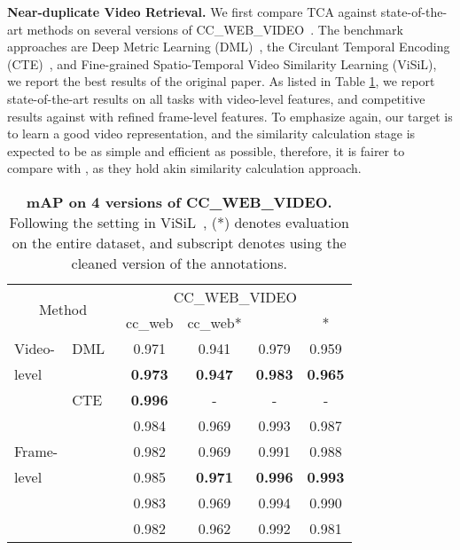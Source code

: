 \documentclass[10pt,twocolumn,letterpaper]{article}
\begin{document}
\noindent\textbf{Near-duplicate Video Retrieval.} \label{paragraph:ndvr}
We ﬁrst compare TCA against state-of-the-art methods on several versions of CC\_WEB\_VIDEO~\cite{wu2007practical}. The benchmark approaches are Deep Metric Learning (DML)~\cite{kordopatis2017dml}, the Circulant Temporal Encoding (CTE)~\cite{revaud2013event}, and Fine-grained Spatio-Temporal Video Similarity Learning (ViSiL), we report the best results of the original paper. As listed in Table \ref{tab:ccweb}, we report state-of-the-art results on all tasks with video-level features, and competitive results against  with refined frame-level features. To emphasize again, our target is to learn a good video representation, and the similarity calculation stage is expected to be as simple and efficient as possible, therefore, it is fairer to compare  with , as they hold akin similarity calculation approach. 
\begin{table}[htb]
\setlength{\tabcolsep}{3pt}
\caption{\textbf{mAP on 4 versions of CC\_WEB\_VIDEO.} Following the setting in ViSiL~\cite{kordopatis2019visil}, (*) denotes evaluation on the entire dataset, and subscript  denotes using the cleaned version of the annotations.} \label{tab:ccweb}
{\small
\begin{tabular}{llcccc}
\toprule
\multicolumn{2}{c}{\multirow{2}{*}{Method}} & \multicolumn{4}{c}{CC\_WEB\_VIDEO}        \\
\cmidrule{3-6}
\multicolumn{2}{c}{}                        & cc\_web & cc\_web* &  & * \\
\midrule
Video-  & DML~\cite{kordopatis2017dml}         & 0.971   & 0.941    & 0.979    & 0.959     \\
level  &        &\textbf{0.973}   & \textbf{0.947}    & \textbf{0.983}    & \textbf{0.965}     \\
\cmidrule{1-6}
                              & CTE~\cite{revaud2013event}         & \textbf{0.996}   & -        & -        & -         \\
                              & ~\cite{kordopatis2019visil}     & 0.984   & 0.969    & 0.993    & 0.987     \\
Frame-                        & ~\cite{kordopatis2019visil}   & 0.982   & 0.969    & 0.991    & 0.988     \\
level                         & ~\cite{kordopatis2019visil}     & 0.985   & \textbf{0.971}    & \textbf{0.996}    & \textbf{0.993} \\
                              &        & 0.983   & 0.969    & 0.994    & 0.990     \\
                              &    & 0.982    & 0.962    & 0.992    & 0.981     \\
\bottomrule
\end{tabular}
}
\end{table}
\end{document}
